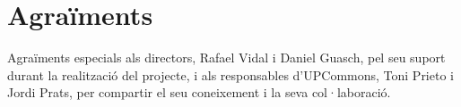 \chapter*{Agraïments}\label{ch:acknowledgments-ca}

Agraïments especials als directors, Rafael Vidal i Daniel Guasch, pel seu suport durant la realització del projecte, i als responsables d'UPCommons, Toni Prieto i Jordi Prats, per compartir el seu coneixement i la seva col·laboració.